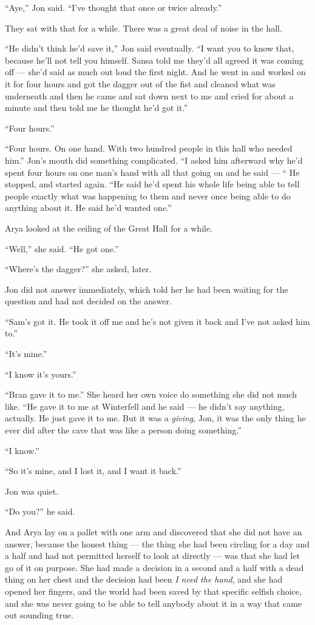 “Aye,” Jon said. “I’ve thought that once or twice already.”

They sat with that for a while. There was a great deal of noise in the hall.

“He didn’t think he’d save it,” Jon said eventually. “I want you to know that, because he’ll not tell you himself. Sansa told me they’d all agreed it was coming off — she’d said as much out loud the first night. And he went in and worked on it for four hours and got the dagger out of the fist and cleaned what was underneath and then he came and sat down next to me and cried for about a minute and then told me he thought he’d got it.”

“Four hours.”

“Four hours. On one hand. With two hundred people in this hall who needed him.” Jon’s mouth did something complicated. “I asked him afterward why he’d spent four hours on one man’s hand with all that going on and he said — “ He stopped, and started again. “He said he’d spent his whole life being able to tell people exactly what was happening to them and never once being able to do anything about it. He said he’d wanted one.”

Arya looked at the ceiling of the Great Hall for a while.

“Well,” she said. “He got one.”

\sceneBreak

“Where’s the dagger?” she asked, later.

Jon did not answer immediately, which told her he had been waiting for the question and had not decided on the answer.

“Sam’s got it. He took it off me and he’s not given it back and I’ve not asked him to.”

“It’s mine.”

“I know it’s yours.”

“Bran gave it to me.” She heard her own voice do something she did not much like. “He gave it to me at Winterfell and he said — he didn’t say anything, actually. He just gave it to me. But it was a \textit{giving}, Jon, it was the only thing he ever did after the cave that was like a person doing something.”

“I know.”

“So it’s mine, and I lost it, and I want it back.”

Jon was quiet.

“Do you?” he said.

And Arya lay on a pallet with one arm and discovered that she did not have an answer, because the honest thing — the thing she had been circling for a day and a half and had not permitted herself to look at directly — was that she had let go of it on purpose. She had made a decision in a second and a half with a dead thing on her chest and the decision had been \textit{I need the hand}, and she had opened her fingers, and the world had been saved by that specific selfish choice, and she was never going to be able to tell anybody about it in a way that came out sounding true.

